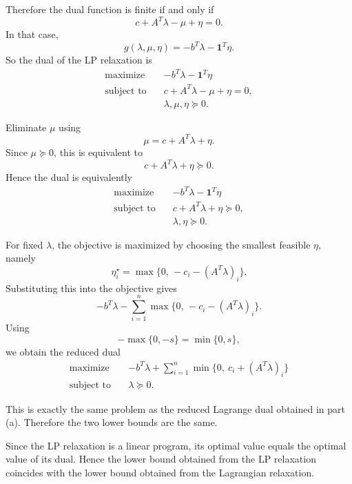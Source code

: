 \documentclass[11pt,letter,notitlepage]{article}
\theoremstyle{definition}
\begin{document}
\begin{solution}
\begin{enumerate}
    Therefore the dual function is finite if and only if
    \[
    c+A^T\lambda-\mu+\eta=0.
    \]
    In that case,
    \[
    g(\lambda,\mu,\eta)=-b^T\lambda-\mathbf 1^T\eta.
    \]
    So the dual of the LP relaxation is
    \[
    \begin{aligned}
        \text{maximize}\quad & -b^T\lambda-\mathbf 1^T\eta\\
        \text{subject to}\quad & c+A^T\lambda-\mu+\eta=0,\\
        & \lambda,\mu,\eta\succeq 0.
    \end{aligned}
    \]

    Eliminate $\mu$ using
    \[
    \mu=c+A^T\lambda+\eta.
    \]
    Since $\mu\succeq 0$, this is equivalent to
    \[
    c+A^T\lambda+\eta\succeq 0.
    \]
    Hence the dual is equivalently
    \[
    \begin{aligned}
        \text{maximize}\quad & -b^T\lambda-\mathbf 1^T\eta\\
        \text{subject to}\quad & c+A^T\lambda+\eta\succeq 0,\\
        & \lambda,\eta\succeq 0.
    \end{aligned}
    \]

    For fixed $\lambda$, the objective is maximized by choosing the smallest
    feasible $\eta$, namely
    \[
    \eta_i^\star=\max\{0,\,-c_i-(A^T\lambda)_i\}.
    \]
    Substituting this into the objective gives
    \[
    -b^T\lambda-\sum_{i=1}^n \max\{0,\,-c_i-(A^T\lambda)_i\}.
    \]
    Using
    \[
    -\max\{0,-s\}=\min\{0,s\},
    \]
    we obtain the reduced dual
    \[
    \boxed{
    \begin{aligned}
        \text{maximize}\quad &
        -b^T\lambda+\sum_{i=1}^n \min\bigl\{0,\ c_i+(A^T\lambda)_i\bigr\}\\
        \text{subject to}\quad & \lambda\succeq 0.
    \end{aligned}}
    \]

    This is exactly the same problem as the reduced Lagrange dual obtained
    in part (a). Therefore the two lower bounds are the same.

    Since the LP relaxation is a linear program, its optimal value equals
    the optimal value of its dual. Hence the lower bound obtained from the
    LP relaxation coincides with the lower bound obtained from the
    Lagrangian relaxation.
\end{enumerate}

\end{solution}
\end{document}

